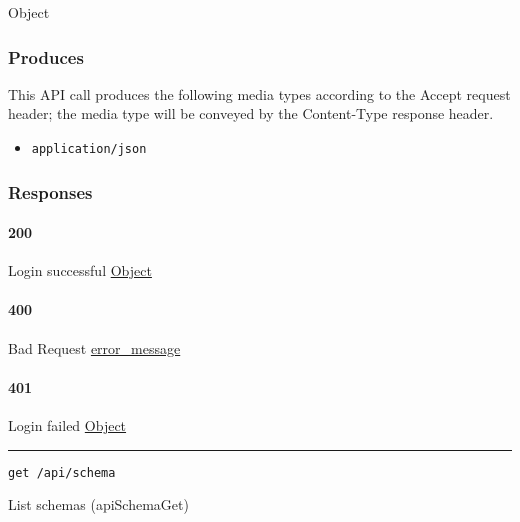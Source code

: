 Object

\hypertarget{produces-75}{%
\subsubsection{Produces}\label{produces-75}}

This API call produces the following media types according to the
{Accept} request header; the media type will be conveyed by the
{Content-Type} response header.

\begin{itemize}
\tightlist
\item
  \texttt{application/json}
\end{itemize}

\hypertarget{responses-75}{%
\subsubsection{Responses}\label{responses-75}}

\hypertarget{section-249}{%
\paragraph{200}\label{section-249}}

Login successful \protect\hyperlink{Object}{Object}

\hypertarget{section-250}{%
\paragraph{400}\label{section-250}}

Bad Request \protect\hyperlink{error_message}{error\_message}

\hypertarget{section-251}{%
\paragraph{401}\label{section-251}}

Login failed \protect\hyperlink{Object}{Object}

\begin{center}\rule{0.5\linewidth}{\linethickness}\end{center}

\protect\hypertarget{apiSchemaGet}{}{}

\begin{verbatim}
get /api/schema
\end{verbatim}

List schemas ({apiSchemaGet})

